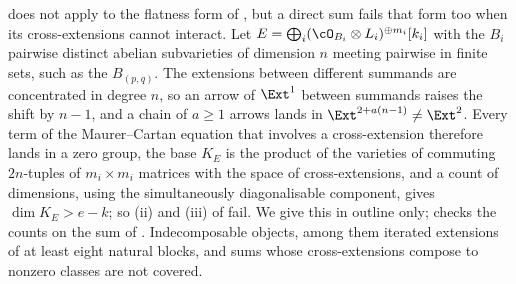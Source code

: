 \begin{remark}\label{rem:flatsums}
 does not apply to the flatness form of
, but a direct sum fails that form too when its
cross-extensions cannot interact. Let $E=\bigoplus_{i}(\cO_{B_{i}}\otimes
L_{i})^{\oplus m_{i}}[k_{i}]$ with the $B_{i}$ pairwise distinct abelian
subvarieties of dimension $n$ meeting pairwise in finite sets, such as the
$B_{(p,q)}$. The extensions between different summands are concentrated in
degree $n$, so an arrow of $\Ext^{1}$ between summands raises the shift by
$n-1$, and a chain of $a\ge1$ arrows lands in $\Ext^{2+a(n-1)}\ne\Ext^{2}$.
Every term of the Maurer--Cartan equation that involves a cross-extension
therefore lands in a zero group, the base $K_{E}$ is the product of the
varieties of commuting $2n$-tuples of $m_{i}\times m_{i}$ matrices with the
space of cross-extensions, and a count of dimensions, using the
simultaneously diagonalisable component, gives $\dim K_{E}>e-k$; so (ii) and
(iii) of  fail. We give this in outline only; \cite{BMB26}
checks the counts on the sum of . Indecomposable objects,
among them iterated extensions of at least eight natural blocks, and sums
whose cross-extensions compose to nonzero classes are not covered.
\end{remark}
